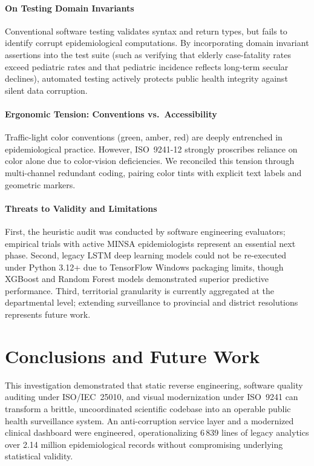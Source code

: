 \documentclass[conference]{IEEEtran}
\begin{document}
\paragraph{On Testing Domain Invariants}
Conventional software testing validates syntax and return types, but fails to identify corrupt epidemiological computations. By incorporating domain invariant assertions into the test suite (such as verifying that elderly case-fatality rates exceed pediatric rates and that pediatric incidence reflects long-term secular declines), automated testing actively protects public health integrity against silent data corruption.

\paragraph{Ergonomic Tension: Conventions vs.\ Accessibility}
Traffic-light color conventions (green, amber, red) are deeply entrenched in epidemiological practice. However, ISO~9241-12 strongly proscribes reliance on color alone due to color-vision deficiencies. We reconciled this tension through multi-channel redundant coding, pairing color tints with explicit text labels and geometric markers.

\paragraph{Threats to Validity and Limitations}
First, the heuristic audit was conducted by software engineering evaluators; empirical trials with active MINSA epidemiologists represent an essential next phase. Second, legacy LSTM deep learning models could not be re-executed under Python 3.12+ due to TensorFlow Windows packaging limits, though XGBoost and Random Forest models demonstrated superior predictive performance. Third, territorial granularity is currently aggregated at the departmental level; extending surveillance to provincial and district resolutions represents future work.

\section{Conclusions and Future Work}
\label{sec:conclusions}

This investigation demonstrated that static reverse engineering, software quality auditing under ISO/IEC~25010, and visual modernization under ISO~9241 can transform a brittle, uncoordinated scientific codebase into an operable public health surveillance system. An anti-corruption service layer and a modernized clinical dashboard were engineered, operationalizing 6\,839 lines of legacy analytics over 2.14 million epidemiological records without compromising underlying statistical validity.
\end{document}
